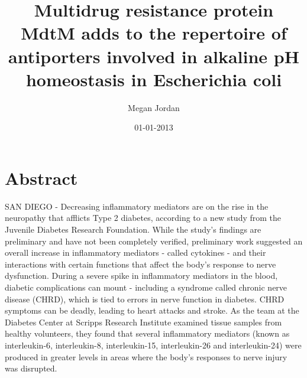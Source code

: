 \documentclass{article}%
\title{Multidrug resistance protein MdtM adds to the repertoire of antiporters involved in alkaline pH homeostasis in Escherichia coli}%
\author{Megan Jordan}%
\affil{Institute of Pharmacology, Toxicology and Pharmacy, Ludwig{-}Maximilians{-}University, Munich, Germany}%
\date{01{-}01{-}2013}%
\begin{document}
%
\normalsize%
\maketitle%
\section{Abstract}%
\label{sec:Abstract}%
SAN DIEGO {-} Decreasing inflammatory mediators are on the rise in the neuropathy that afflicts Type 2 diabetes, according to a new study from the Juvenile Diabetes Research Foundation.\newline%
While the study's findings are preliminary and have not been completely verified, preliminary work suggested an overall increase in inflammatory mediators {-} called cytokines {-} and their interactions with certain functions that affect the body's response to nerve dysfunction.\newline%
During a severe spike in inflammatory mediators in the blood, diabetic complications can mount {-} including a syndrome called chronic nerve disease (CHRD), which is tied to errors in nerve function in diabetes. CHRD symptoms can be deadly, leading to heart attacks and stroke.\newline%
As the team at the Diabetes Center at Scripps Research Institute examined tissue samples from healthy volunteers, they found that several inflammatory mediators (known as interleukin{-}6, interleukin{-}8, interleukin{-}15, interleukin{-}26 and interleukin{-}24) were produced in greater levels in areas where the body's responses to nerve injury was disrupted.\newline%
\end{document}
